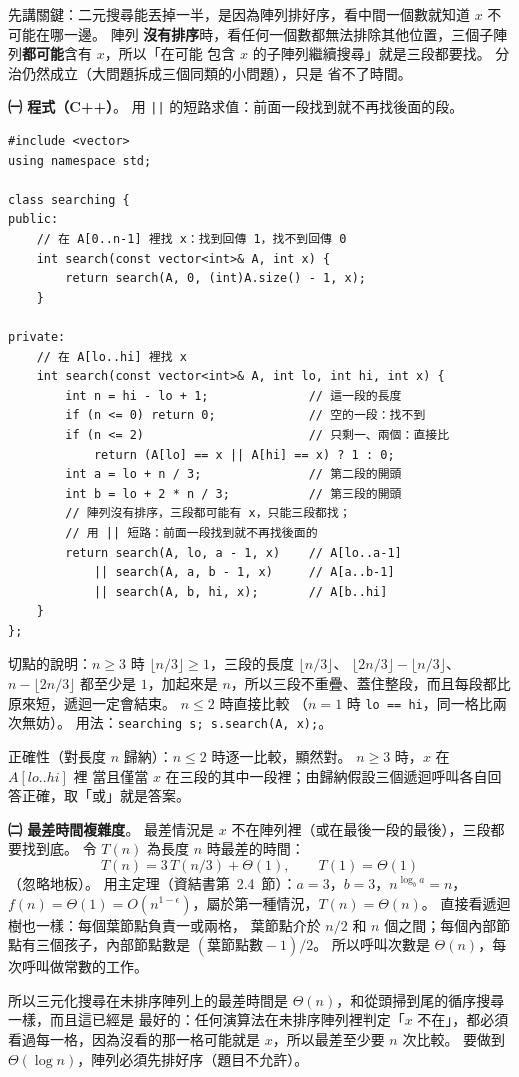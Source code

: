 \begin{pastsoln}
先講關鍵：二元搜尋能丟掉一半，是因為陣列排好序，看中間一個數就知道 $x$ 不可能在哪一邊。 陣列
\textbf{沒有排序}時，看任何一個數都無法排除其他位置，三個子陣列\textbf{都可能}含有 $x$，所以「在可能
包含 $x$ 的子陣列繼續搜尋」就是三段都要找。 分治仍然成立（大問題拆成三個同類的小問題），只是
省不了時間。

\textbf{㈠ 程式（C++）}。 用 \texttt{||} 的短路求值：前面一段找到就不再找後面的段。
\begin{verbatim}
#include <vector>
using namespace std;

class searching {
public:
    // 在 A[0..n-1] 裡找 x：找到回傳 1，找不到回傳 0
    int search(const vector<int>& A, int x) {
        return search(A, 0, (int)A.size() - 1, x);
    }

private:
    // 在 A[lo..hi] 裡找 x
    int search(const vector<int>& A, int lo, int hi, int x) {
        int n = hi - lo + 1;              // 這一段的長度
        if (n <= 0) return 0;             // 空的一段：找不到
        if (n <= 2)                       // 只剩一、兩個：直接比
            return (A[lo] == x || A[hi] == x) ? 1 : 0;
        int a = lo + n / 3;               // 第二段的開頭
        int b = lo + 2 * n / 3;           // 第三段的開頭
        // 陣列沒有排序，三段都可能有 x，只能三段都找；
        // 用 || 短路：前面一段找到就不再找後面的
        return search(A, lo, a - 1, x)    // A[lo..a-1]
            || search(A, a, b - 1, x)     // A[a..b-1]
            || search(A, b, hi, x);       // A[b..hi]
    }
};
\end{verbatim}
切點的說明：$n \ge 3$ 時 $\lfloor n/3 \rfloor \ge 1$，三段的長度 $\lfloor n/3 \rfloor$、
$\lfloor 2n/3 \rfloor - \lfloor n/3 \rfloor$、$n - \lfloor 2n/3 \rfloor$ 都至少是 $1$，加起來是
$n$，所以三段不重疊、蓋住整段，而且每段都比原來短，遞迴一定會結束。 $n \le 2$ 時直接比較
（$n = 1$ 時 \texttt{lo == hi}，同一格比兩次無妨）。 用法：\texttt{searching s; s.search(A, x);}。

正確性（對長度 $n$ 歸納）：$n \le 2$ 時逐一比較，顯然對。 $n \ge 3$ 時，$x$ 在 $A[lo..hi]$ 裡
當且僅當 $x$ 在三段的其中一段裡；由歸納假設三個遞迴呼叫各自回答正確，取「或」就是答案。

\textbf{㈡ 最差時間複雜度}。 最差情況是 $x$ 不在陣列裡（或在最後一段的最後），三段都要找到底。
令 $T(n)$ 為長度 $n$ 時最差的時間：
\[
T(n) = 3\,T(n/3) + \Theta(1), \qquad T(1) = \Theta(1)
\]
（忽略地板）。 用主定理（資結書第~2.4~節）：$a = 3$，$b = 3$，$n^{\log_b a} = n$，$f(n) = \Theta(1) =
O(n^{1 - \epsilon})$，屬於第一種情況，$T(n) = \Theta(n)$。 直接看遞迴樹也一樣：每個葉節點負責一或兩格，
葉節點介於 $n/2$ 和 $n$ 個之間；每個內部節點有三個孩子，內部節點數是 $(\text{葉節點數} - 1)/2$。
所以呼叫次數是 $\Theta(n)$，每次呼叫做常數的工作。

所以三元化搜尋在未排序陣列上的最差時間是 $\Theta(n)$，和從頭掃到尾的循序搜尋一樣，而且這已經是
最好的：任何演算法在未排序陣列裡判定「$x$ 不在」，都必須看過每一格，因為沒看的那一格可能就是
$x$，所以最差至少要 $n$ 次比較。 要做到 $\Theta(\log n)$，陣列必須先排好序（題目不允許）。
\end{pastsoln}
